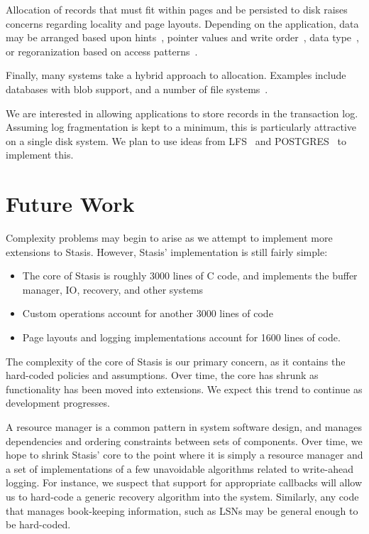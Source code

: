 \documentclass[letterpaper,twocolumn,10pt]{article}
\newcommand{\yad}{Stasis\xspace}
\newcommand{\yads}{Stasis'\xspace}
\newcommand{\rcs}[1]{\textcolor{green}{\bf RCS: #1}}
\begin{document}
Allocation of records that must fit within pages and be persisted to
disk raises concerns regarding locality and page layouts.  Depending
on the application, data may be arranged based upon
hints~\cite{cricket}, pointer values and write order~\cite{starburst},
data type~\cite{orion}, or regoranization based on access
patterns~\cite{storageReorganization}.


Finally, many systems take a hybrid approach to allocation.  Examples include
databases with blob support, and a number of
file systems~\cite{reiserfs,ffs}.

We are interested in allowing applications to store records in
the transaction log.  Assuming log fragmentation is kept to a
minimum, this is particularly attractive on a single disk system.  We
plan to use ideas from LFS~\cite{lfs} and POSTGRES~\cite{postgres}
to implement this.

\section{Future Work}

Complexity problems may begin to arise as we attempt to implement more
extensions to \yad.  However, \yads implementation is still fairly simple:

\begin{itemize}
\item The core of \yad is roughly 3000 lines
of C code, and implements the buffer manager, IO, recovery, and other
systems
\item Custom operations account for another 3000 lines of code
\item Page layouts and logging implementations account for 1600 lines of code.
\end{itemize}

The complexity of the core of \yad is our primary concern, as it
contains the hard-coded policies and assumptions.  Over time, the core has
shrunk as functionality has been moved into extensions.  We expect
this trend to continue as development progresses.  

A resource manager
is a common pattern in system software design, and manages
dependencies and ordering constraints between sets of components.
Over time, we hope to shrink \yads core to the point where it is
simply a resource manager and a set of implementations of a few unavoidable
algorithms related to write-ahead logging.  For instance, 
we suspect that support for appropriate callbacks will 
allow us to hard-code a generic recovery algorithm into the 
system.  Similarly, any code that manages book-keeping information, such as 
LSNs may be general enough to be hard-coded.  
\end{document}
